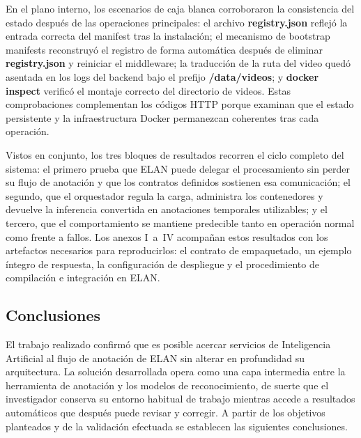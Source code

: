 En el plano interno, los escenarios de caja blanca corroboraron la consistencia del estado después de las operaciones principales: el archivo \textbf{registry.json} reflejó la entrada correcta del manifest tras la instalación; el mecanismo de bootstrap manifests reconstruyó el registro de forma automática después de eliminar \textbf{registry.json} y reiniciar el middleware; la traducción de la ruta del video quedó asentada en los logs del backend bajo el prefijo \textbf{/data/videos}; y \textbf{docker inspect} verificó el montaje correcto del directorio de videos. Estas comprobaciones complementan los códigos HTTP porque examinan que el estado persistente y la infraestructura Docker permanezcan coherentes tras cada operación.

Vistos en conjunto, los tres bloques de resultados recorren el ciclo completo del sistema: el primero prueba que ELAN puede delegar el procesamiento sin perder su flujo de anotación y que los contratos definidos sostienen esa comunicación; el segundo, que el orquestador regula la carga, administra los contenedores y devuelve la inferencia convertida en anotaciones temporales utilizables; y el tercero, que el comportamiento se mantiene predecible tanto en operación normal como frente a fallos. Los anexos I~a~IV acompañan estos resultados con los artefactos necesarios para reproducirlos: el contrato de empaquetado, un ejemplo íntegro de respuesta, la configuración de despliegue y el procedimiento de compilación e integración en ELAN.

\vspace{1\baselineskip}


\subsection{Conclusiones}

El trabajo realizado confirmó que es posible acercar servicios de Inteligencia Artificial al flujo de anotación de ELAN sin alterar en profundidad su arquitectura. La solución desarrollada opera como una capa intermedia entre la herramienta de anotación y los modelos de reconocimiento, de suerte que el investigador conserva su entorno habitual de trabajo mientras accede a resultados automáticos que después puede revisar y corregir. A partir de los objetivos planteados y de la validación efectuada se establecen las siguientes conclusiones.

